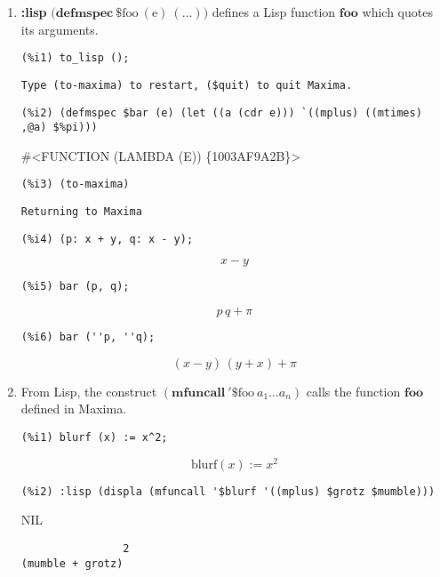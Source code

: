 \documentclass[12pt,leqno]{article}
\begin{document}
\begin{enumerate}
\item {\bf :lisp} $\mathrm{(}\mathbf{defmspec\ } \mathrm{\$foo\ (e)\ (\ldots))}$
defines a Lisp function $\mathbf{foo}$ which quotes its arguments.
\begin{verbatim}
(%i1) to_lisp ();
\end{verbatim}
\begin{Verbatim}
Type (to-maxima) to restart, ($quit) to quit Maxima.
\end{Verbatim}
\begin{verbatim}
(%i2) (defmspec $bar (e) (let ((a (cdr e))) `((mplus) ((mtimes) ,@a) $%pi)))
\end{verbatim}
\#\textless FUNCTION (LAMBDA (E)) \{1003AF9A2B\}\textgreater 
\begin{verbatim}
(%i3) (to-maxima)
\end{verbatim}
\begin{Verbatim}
Returning to Maxima
\end{Verbatim}
\begin{verbatim}
(%i4) (p: x + y, q: x - y);
\end{verbatim}
\begin{equation}
x-y\tag{\%o4}
\label{eq:doc-group1-code38-4-1}
\end{equation}
\begin{verbatim}
(%i5) bar (p, q);
\end{verbatim}
\begin{equation}
p\,q+\pi\tag{\%o5}
\label{eq:doc-group1-code38-5-1}
\end{equation}
\begin{verbatim}
(%i6) bar (''p, ''q);
\end{verbatim}
\begin{equation}
\left(x-y\right)\,\left(y+x\right)+\pi\tag{\%o6}
\label{eq:doc-group1-code38-6-1}
\end{equation}


\item From Lisp, the construct $(\mathbf{mfuncall\ '\$}\mathrm{foo\ }a_1 \ldots a_n)$
calls the function $\mathbf{foo}$ defined in Maxima.

\begin{verbatim}
(%i1) blurf (x) := x^2;
\end{verbatim}
\begin{equation}
\mathrm{blurf}\left(x\right):=x^2\tag{\%o1}
\label{eq:doc-group1-code39-1-1}
\end{equation}
\begin{verbatim}
(%i2) :lisp (displa (mfuncall '$blurf '((mplus) $grotz $mumble)))
\end{verbatim}
NIL
\begin{Verbatim}
                2
(mumble + grotz)
\end{Verbatim}

\end{enumerate}
\end{document}
